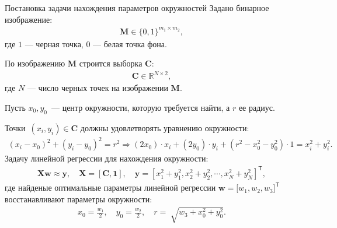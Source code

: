 \documentclass[9pt,pdf,hyperref={unicode}]{beamer}
\begin{document}
\begin{frame}[shrink=5]{Постановка задачи нахождения параметров окружностей}
\justifying
Задано бинарное изображение:
\begin{equation*}
\begin{aligned}
\textbf{M} \in \{0,1\}^{m_1 \times m_2},
\end{aligned}
\end{equation*}
где $1$ --- черная точка, $0$ --- белая точка фона.

По изображению $\textbf{M}$ строится выборка $\textbf{C}$:
\begin{equation*}
\begin{aligned}
\textbf{C} \in  \mathbb{R}^{N \times 2},
\end{aligned}
\end{equation*}
где $N$ --- число черных точек на изображении $\textbf{M}$.

Пусть $x_0, y_0$~--- центр окружности, которую требуется найти, а $r$ ее радиус.

Точки~$\left(x_i, y_i\right)\in\textbf{C}$ должны удовлетворять уравнению окружности:
\begin{equation*}
\begin{aligned}
\left(x_i - x_0\right)^{2}+\left(y_i-y_0\right)^2 = r^2 \Rightarrow (2x_0)\cdot x_i + (2y_0)\cdot y_i+(r^2-x_0^2-y_0^2)\cdot1 = x_{i}^2 + y_{i}^2.
\end{aligned}
\end{equation*}
Задачу линейной регрессии для нахождения окружности:
\begin{equation*}
\begin{aligned}
\textbf{X}\textbf{w} \approx \textbf{y},  \quad \textbf{X} = \left[\textbf{C}, \textbf{1}\right], \quad \textbf{y} = [x_1^2+y_1^2, x_2^2+y_2^2, \cdots, x_N^2+y_N^2]^{\mathsf{T}},
\end{aligned}
\end{equation*}
где найденые оптимальные параметры линейной регрессии $\textbf{w} = \bigr[w_1, w_2, w_3\bigr]^{\mathsf{T}}$ восстанавливают параметры окружности:
\begin{equation*}
\begin{aligned}
x_0 = \frac{w_1}{2}, \quad y_0 = \frac{w_2}{2}, \quad r = \sqrt[]{w_3+x_{0}^{2}+y_{0}^{2}}.
\end{aligned}
\end{equation*}

\end{frame}
\end{document}
